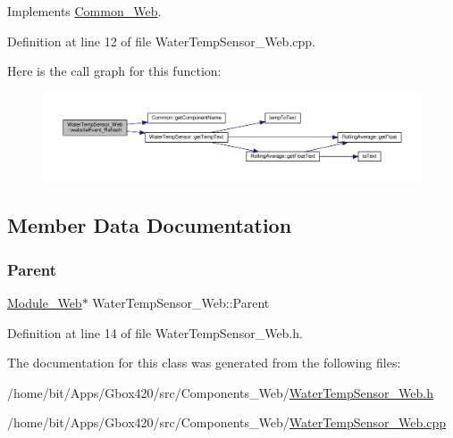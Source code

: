 Implements \hyperlink{class_common___web_aaca7c54fdcf908e4e1256b7b1f6fc212}{Common\+\_\+\+Web}.



Definition at line 12 of file Water\+Temp\+Sensor\+\_\+\+Web.\+cpp.

Here is the call graph for this function\+:
\nopagebreak
\begin{figure}[H]
\begin{center}
\leavevmode
\includegraphics[width=350pt]{class_water_temp_sensor___web_a930d46ab1e337e085a06058d8c07f76b_cgraph}
\end{center}
\end{figure}


\subsection{Member Data Documentation}
\mbox{\label{class_water_temp_sensor___web_a280430f35417e6e84ca307734f9e18b3}} 
\subsubsection{\texorpdfstring{Parent}{Parent}}
{\footnotesize\ttfamily \hyperlink{class_module___web}{Module\+\_\+\+Web}$\ast$ Water\+Temp\+Sensor\+\_\+\+Web\+::\+Parent\hspace{0.3cm}{\ttfamily [protected]}}



Definition at line 14 of file Water\+Temp\+Sensor\+\_\+\+Web.\+h.



The documentation for this class was generated from the following files\+:\begin{DoxyCompactItemize}
\item 
/home/bit/\+Apps/\+Gbox420/src/\+Components\+\_\+\+Web/\hyperlink{_water_temp_sensor___web_8h}{Water\+Temp\+Sensor\+\_\+\+Web.\+h}\item 
/home/bit/\+Apps/\+Gbox420/src/\+Components\+\_\+\+Web/\hyperlink{_water_temp_sensor___web_8cpp}{Water\+Temp\+Sensor\+\_\+\+Web.\+cpp}\end{DoxyCompactItemize}
